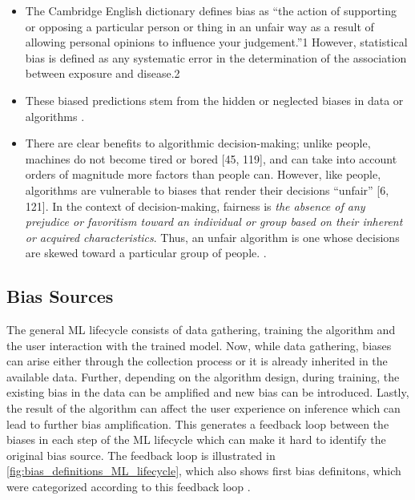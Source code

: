\documentclass[12pt, a4paper, oneside]{book}   	%
\newif\ifrawcitationactive
\newcommand{\rawcitationusedstart}{\color{violet}}
\newcommand{\rawcitationusedend}{%
	\ifrawcitationactive
	\color{purple}  %
	\else
	\color{black}  %
	\fi
}
\begin{document}
			\rawcitationusedstart
			\begin{itemize}
				\item The Cambridge English dictionary defines bias as “the action of supporting or opposing a particular person or thing in an unfair way as a result of allowing personal opinions to influence your judgement.”1 However, statistical bias is defined as any systematic error in the determination of the association between exposure and disease.2 \autocite{Chakraborty_2024}
				\item These biased predictions stem from the hidden or neglected biases in data or algorithms \autocite{Mehrabi_2021}.
				\item There are clear benefits to algorithmic decision-making; unlike people, machines do not become tired or bored [45, 119], and can take into account orders of magnitude more factors than people can. However, like people, algorithms are vulnerable to biases that render their decisions “unfair” [6, 121]. In the context of decision-making, fairness is \textit{the absence of any prejudice or favoritism toward an individual or group based on their inherent or acquired characteristics}. Thus, an unfair algorithm is one whose decisions are skewed toward a particular group of people. \autocite{Mehrabi_2021}.
			\end{itemize}
			\rawcitationusedend
			
			\subsection{Bias Sources}
			The general \gls{ML} lifecycle consists of data gathering, training the algorithm and the user interaction with the trained model. Now, while data gathering, biases can arise either through the collection process or it is already inherited in the available data. Further, depending on the algorithm design, during training, the existing bias in the data can be amplified and new bias can be introduced. Lastly, the result of the algorithm can affect the user experience on inference which can lead to further bias amplification. This generates a feedback loop between the biases in each step of the \gls{ML} lifecycle which can make it hard to identify the original bias source. The feedback loop is illustrated in \autoref{fig:bias_definitions_ML_lifecycle}, which also shows first bias definitons, which were categorized according to this feedback loop \autocite{Mehrabi_2021}.
			
\end{document}
